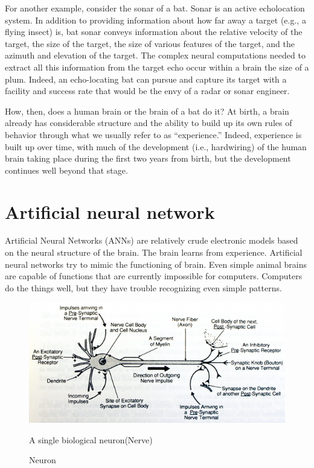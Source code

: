 \documentclass[12pt]{article}
\begin{document}
For another example, consider the sonar of a bat. Sonar is an active echolocation system. In addition to providing information about how far away a target (e.g., a flying insect) is, bat sonar conveys information about the relative velocity of the target, the size of the target, the size of various features of the target, and the azimuth and elevation of the target. The complex neural computations needed to extract all this information from the target echo occur within a brain the size of a plum. Indeed, an echo-locating bat can pursue and capture its target with a facility and success rate that would be the envy of a radar or sonar engineer. 

How, then, does a human brain or the brain of a bat do it? At birth, a brain already has considerable structure and the ability to build up its own rules of behavior through what we usually refer to as “experience.” Indeed, experience is built up over time, with much of the development (i.e., hardwiring) of the human brain taking place during the first two years from birth, but the development continues well beyond that stage.



\section{\fontsize{14}{14}\selectfont Artificial neural network}
\par Artificial  Neural  Networks  (ANNs)  are  relatively  crude  electronic  models based  on  the  neural  structure  of  the brain.  The  brain  learns  from  experience. Artificial neural networks try to mimic the functioning of brain. Even simple animal brains   are   capable   of   functions   that   are currently   impossible   for   computers. Computers  do  the  things  well,  but  they  have  trouble recognizing  even  simple patterns.  

\begin{figure}[h]
	\centering
    \includegraphics[width=0.55 \textwidth]{b.png}
    \caption{Neuron}
    \label{fig:mesh2}
    A single biological neuron(Nerve)
     
\end{figure}
\end{document}
